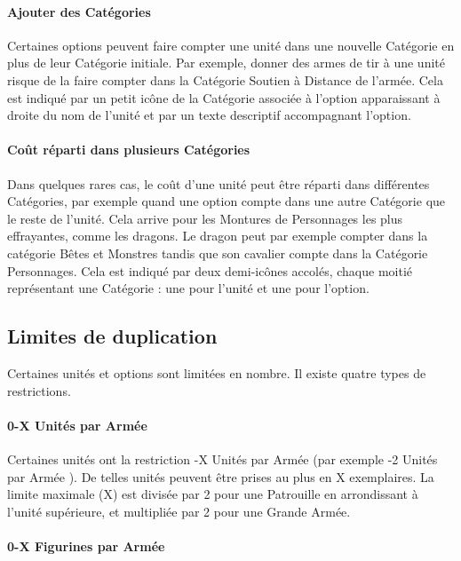 \paragraph{Ajouter des Catégories}

Certaines options peuvent faire compter une unité dans une nouvelle Catégorie en plus de leur Catégorie initiale. Par exemple, donner des armes de tir à une unité risque de la faire compter dans la Catégorie \og Soutien à Distance \fg{} de l'armée. Cela est indiqué par un petit icône de la Catégorie associée à l'option apparaissant à droite du nom de l'unité et par un texte descriptif accompagnant l'option.

\paragraph{Coût réparti dans plusieurs Catégories}

Dans quelques rares cas, le coût d'une unité peut être réparti dans différentes Catégories, par exemple quand une option compte dans une autre Catégorie que le reste de l'unité. Cela arrive pour les Montures de Personnages les plus effrayantes, comme les dragons. Le dragon peut par exemple compter dans la catégorie \og Bêtes et Monstres \fg{} tandis que son cavalier compte dans la Catégorie Personnages. Cela est indiqué par deux demi-icônes accolés, chaque moitié représentant une Catégorie : une pour l'unité et une pour l'option.

\subsection{Limites de duplication}

Certaines unités et options sont limitées en nombre. Il existe quatre types de restrictions.

\paragraph{0-X Unités par Armée}

Certaines unités ont la restriction -X Unités par Armée \fg{} (par exemple -2 Unités par Armée \fg{}). De telles unités peuvent être prises au plus en X exemplaires. La limite maximale (X) est divisée par 2 pour une Patrouille en arrondissant à l'unité supérieure, et multipliée par 2 pour une Grande Armée.

\paragraph{0-X Figurines par Armée}

